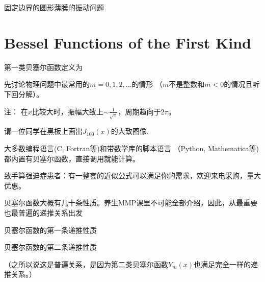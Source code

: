 \documentclass[CJK]{beamer}
\date{}
\begin{document}

\begin{frame}
\bch
\bitem
\item{固定边界的圆形薄膜的振动问题}    
\eitem
\ech
\end{frame}

\section{Bessel Functions of the First Kind}

\begin{frame}
  \bch
  第一类贝塞尔函数定义为

  先讨论物理问题中最常用的$m=0,1,2,\ldots$的情形 （$m$不是整数和$m<0$的情况且听下回分解）。

  \ech
\end{frame}


\begin{frame}
  \bch
  \ech
\end{frame}

\begin{frame}
  \bch
 注： 在$x$比较大时，振幅大致上$\sim \frac{1}{\sqrt{x}}$，周期趋向于$2\pi$。
  \ech
\end{frame}


\begin{frame}
  \bch
  请一位同学在黑板上画出$J_{100}(x)$的大致图像.
  \ech
\end{frame}



\begin{frame}
  \bch
  大多数编程语言(C, Fortran等)和带数学库的脚本语言 （Python, Mathematica等)都内置有贝塞尔函数，直接调用就能计算。

    \skiplines
    
  致手算强迫症患者\huaixiao：有一整套的近似公式可以满足你的需求，欢迎来电采购，量大优惠。
  \ech
\end{frame}


\begin{frame}
  \bch
  贝塞尔函数大概有几十条性质。养生MMP课里不可能全部介绍，因此，从最重要也最普遍的递推关系出发

  {\blue 贝塞尔函数的第一条递推性质}

  {\blue 贝塞尔函数的第二条递推性质}

  （之所以说这是普遍关系，是因为第二类贝塞尔函数$Y_m(x)$也满足完全一样的递推关系。）
  \ech
\end{frame}
\end{document}
